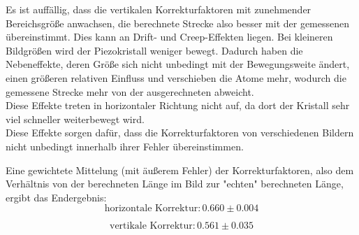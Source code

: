 \documentclass[12pt,a4paper]{article}
\begin{document}
Es ist auffällig, dass die vertikalen Korrekturfaktoren mit zunehmender Bereichsgröße anwachsen, die berechnete Strecke also besser mit der gemessenen übereinstimmt. Dies kann an Drift- und Creep-Effekten liegen. Bei kleineren Bildgrößen wird der Piezokristall weniger bewegt. Dadurch haben die Nebeneffekte, deren Größe sich nicht unbedingt mit der Bewegungsweite ändert, einen größeren relativen Einfluss und verschieben die Atome mehr, wodurch die gemessene Strecke mehr von der ausgerechneten abweicht.\\
Diese Effekte treten in horizontaler Richtung nicht auf, da dort der Kristall sehr viel schneller weiterbewegt wird.\\
Diese Effekte sorgen dafür, dass die Korrekturfaktoren von verschiedenen Bildern nicht unbedingt innerhalb ihrer Fehler übereinstimmen.

Eine gewichtete Mittelung (mit äußerem Fehler) der Korrekturfaktoren, also dem Verhältnis von der berechneten Länge im Bild zur "echten" berechneten Länge, ergibt das Endergebnis:
\begin{equation*}
\boxed{\textrm{horizontale Korrektur}: 0.660\pm 0.004}
\end{equation*}

\begin{equation*}
\boxed{\textrm{vertikale Korrektur}: 0.561\pm 0.035}
\end{equation*}

\newpage
\end{document}
